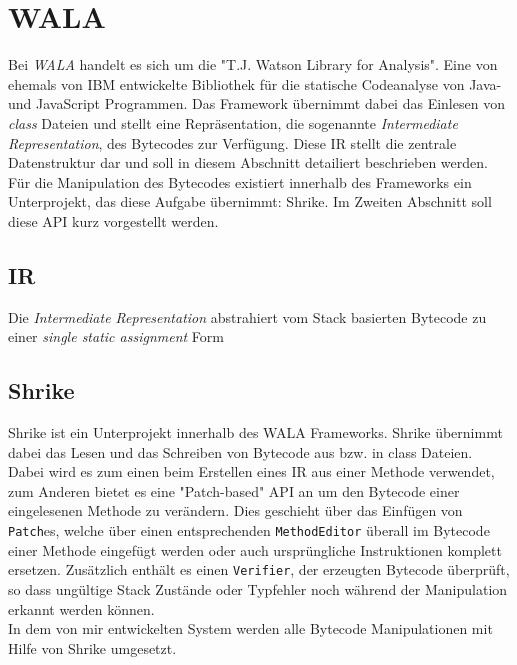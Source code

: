 \section{WALA}

Bei \textit{WALA} handelt es sich um die "T.J. Watson Library for Analysis". Eine von ehemals von IBM entwickelte 
Bibliothek für die statische Codeanalyse von Java- und JavaScript Programmen. Das Framework übernimmt dabei das Einlesen 
von \textit{class} Dateien und stellt eine Repräsentation, die sogenannte \textit{Intermediate Representation}, des 
Bytecodes zur Verfügung. Diese IR stellt die zentrale Datenstruktur dar und soll in diesem Abschnitt detailiert 
beschrieben werden.
\\
Für die Manipulation des Bytecodes existiert innerhalb des Frameworks ein Unterprojekt, das diese Aufgabe übernimmt: 
Shrike. Im Zweiten Abschnitt soll diese API kurz vorgestellt werden.  

\subsection{IR}

Die \textit{Intermediate Representation} abstrahiert vom Stack basierten Bytecode zu einer \textit{single static assignment}
Form

\subsection{Shrike}

Shrike ist ein Unterprojekt innerhalb des WALA Frameworks. Shrike übernimmt dabei das Lesen und das Schreiben von Bytecode 
aus bzw. in class Dateien. Dabei wird es zum einen beim Erstellen eines IR aus einer Methode verwendet, zum Anderen bietet 
es eine "Patch-based" API an um den Bytecode einer eingelesenen Methode zu verändern. Dies geschieht über das Einfügen 
von \texttt{Patch}es, welche über einen entsprechenden \texttt{MethodEditor} überall im Bytecode einer Methode eingefügt 
werden oder auch ursprüngliche Instruktionen komplett ersetzen. Zusätzlich enthält es einen \texttt{Verifier}, der  
erzeugten Bytecode überprüft, so dass ungültige Stack Zustände oder Typfehler noch während der Manipulation erkannt werden können. 
\\
In dem von mir entwickelten System werden alle Bytecode Manipulationen mit Hilfe von Shrike umgesetzt. 

